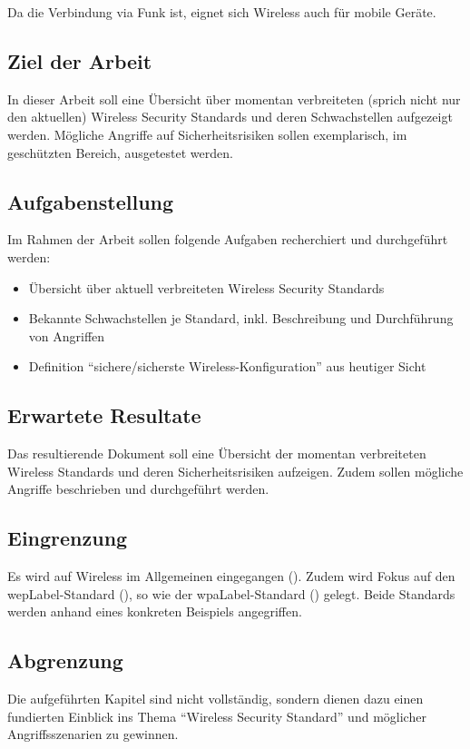 Da die Verbindung via Funk ist, eignet sich Wireless auch für mobile Geräte.

\subsection{Ziel der Arbeit}
In dieser Arbeit soll eine Übersicht über momentan verbreiteten (sprich nicht nur den aktuellen) Wireless Security Standards und deren Schwachstellen aufgezeigt werden.
Mögliche Angriffe auf Sicherheitsrisiken sollen exemplarisch, im geschützten Bereich, ausgetestet werden.

\subsection{Aufgabenstellung}
Im Rahmen der Arbeit sollen folgende Aufgaben recherchiert und durchgeführt werden:
\begin{itemize}
	\item Übersicht über aktuell verbreiteten Wireless Security Standards
	\item Bekannte Schwachstellen je Standard, inkl. Beschreibung und Durchführung von Angriffen
	\item Definition "`sichere/sicherste Wireless-Konfiguration"' aus heutiger Sicht
\end{itemize}

\subsection{Erwartete Resultate}
Das resultierende Dokument soll eine Übersicht der momentan verbreiteten Wireless Standards und deren Sicherheitsrisiken aufzeigen.
Zudem sollen mögliche Angriffe beschrieben und durchgeführt werden.

\subsection{Eingrenzung}
Es wird auf Wireless im Allgemeinen eingegangen ().
Zudem wird Fokus auf den \gls{wepLabel}-Standard (), so wie der \gls{wpaLabel}-Standard () gelegt. Beide Standards werden anhand eines konkreten Beispiels angegriffen.

\subsection{Abgrenzung}
Die aufgeführten Kapitel sind nicht vollständig, sondern dienen dazu einen fundierten Einblick ins Thema "`Wireless Security Standard"' und möglicher Angriffsszenarien zu gewinnen.

